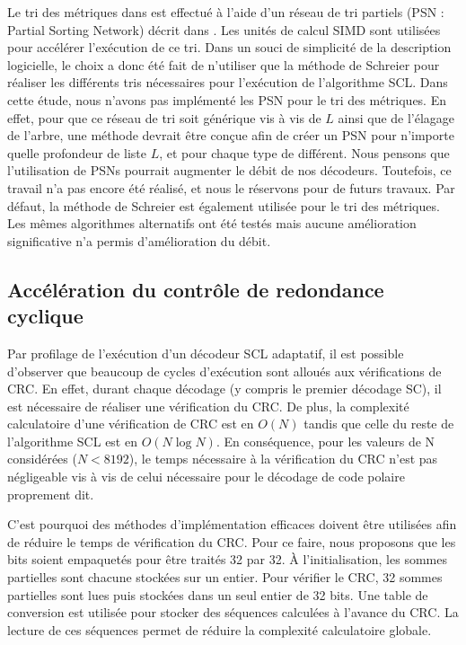 Le tri des métriques dans \cite{sarkis_fast_2016} est effectué à l'aide d'un réseau de tri partiels (PSN : Partial Sorting Network) décrit dans \cite{furtak2007using}. Les unités de calcul SIMD sont utilisées pour accélérer l'exécution de ce tri. 
Dans un souci de simplicité de la description logicielle, le choix a donc été fait de n'utiliser que la méthode de Schreier pour réaliser les différents tris nécessaires pour l'exécution de l'algorithme SCL.
Dans cette étude, nous n'avons pas implémenté les PSN pour le tri des métriques. En effet, pour que ce réseau de tri soit générique vis à vis de $L$ ainsi que de l'élagage de l'arbre, une méthode devrait être conçue afin de créer un PSN pour n'importe quelle profondeur de liste $L$, et pour chaque type de \noeud différent. Nous pensons que l'utilisation de PSNs pourrait augmenter le débit de nos décodeurs. Toutefois, ce travail n'a pas encore été réalisé, et nous le réservons pour de futurs travaux.
Par défaut, la méthode de Schreier est également utilisée pour le tri des métriques. Les mêmes algorithmes alternatifs ont été testés mais aucune amélioration significative n'a permis d'amélioration du débit.

\subsection{Accélération du contrôle de redondance cyclique}

Par profilage de l'exécution d'un décodeur SCL adaptatif, il est possible d'observer que beaucoup de cycles d'exécution sont alloués aux vérifications de CRC.
En effet, durant chaque décodage (y compris le premier décodage SC), il est nécessaire de réaliser une vérification du CRC.
De plus, la complexité calculatoire d'une vérification de CRC est en $O(N)$ tandis que celle du reste de l'algorithme SCL est en $O(N\log N)$.
En conséquence, pour les valeurs de N considérées ($N<8192$), le temps nécessaire à la vérification du CRC n'est pas négligeable vis à vis de celui nécessaire pour le décodage de code polaire proprement dit.

C'est pourquoi des méthodes d'implémentation efficaces doivent être utilisées afin de réduire le temps de vérification du CRC.
Pour ce faire, nous proposons que les bits soient empaquetés pour être traités 32 par 32.
\`A l'initialisation, les sommes partielles sont chacune stockées sur un entier.
Pour vérifier le CRC, 32 sommes partielles sont lues puis stockées dans un seul entier de 32 bits.
Une table de conversion est utilisée pour stocker des séquences calculées à l'avance du CRC.
La lecture de ces séquences permet de réduire la complexité calculatoire globale.

